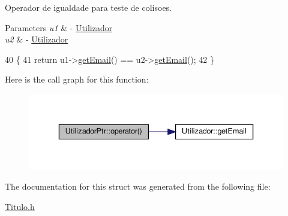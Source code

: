 Operador de igualdade para teste de colisoes. 


\begin{DoxyParams}{Parameters}
{\em u1} & -\/ \hyperlink{classUtilizador}{Utilizador} \\
\hline
{\em u2} & -\/ \hyperlink{classUtilizador}{Utilizador} \\
\hline
\end{DoxyParams}

\begin{DoxyCode}
40                                                                          \{
41         \textcolor{keywordflow}{return} u1->\hyperlink{classUtilizador_aea88bb297704762d0cccc909b8c2da54}{getEmail}() == u2->\hyperlink{classUtilizador_aea88bb297704762d0cccc909b8c2da54}{getEmail}();
42     \}
\end{DoxyCode}
Here is the call graph for this function\+:
\nopagebreak
\begin{figure}[H]
\begin{center}
\leavevmode
\includegraphics[width=336pt]{structUtilizadorPtr_afdc486a21619e0451d59dd4a9f244866_cgraph}
\end{center}
\end{figure}


The documentation for this struct was generated from the following file\+:\begin{DoxyCompactItemize}
\item 
\hyperlink{Titulo_8h}{Titulo.\+h}\end{DoxyCompactItemize}
